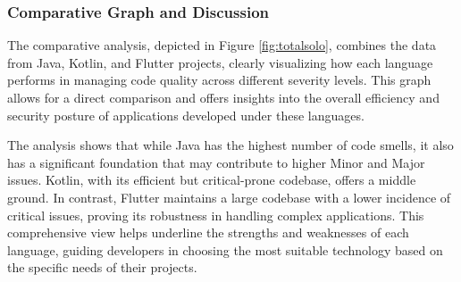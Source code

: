 \subsubsection{Comparative Graph and Discussion}
The comparative analysis, depicted in Figure \ref{fig:totalsolo}, combines the data from Java, Kotlin, and Flutter projects, clearly visualizing how each language performs in managing code quality across different severity levels. This graph allows for a direct comparison and offers insights into the overall efficiency and security posture of applications developed under these languages.
\par
The analysis shows that while Java has the highest number of code smells, it also has a significant foundation that may contribute to higher Minor and Major issues. Kotlin, with its efficient but critical-prone codebase, offers a middle ground. In contrast, Flutter maintains a large codebase with a lower incidence of critical issues, proving its robustness in handling complex applications. This comprehensive view helps underline the strengths and weaknesses of each language, guiding developers in choosing the most suitable technology based on the specific needs of their projects.
